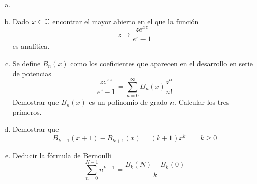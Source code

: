 \documentclass[twoside]{article}
\begin{document}
\newpage 
\begin{ejercicio}{7}
\begin{enumerate}[(a)]
\item[]
\item Dado $x\in \mathbb{C}$ encontrar el mayor abierto en el que la función
$$
z\mapsto \frac{ze^{xz}}{e^z-1}
$$
es analítica.
\item Se define $B_n(x)$ como los coeficientes que aparecen en el desarrollo en serie de potencias
$$
\frac{ze^{xz}}{e^z-1}= \sum_{n=0}^\infty B_n(x)\frac{z^n}{n!}
$$
Demostrar que $B_n(x)$ es un polinomio de grado $n$. Calcular los tres primeros.
\item Demostrar que 
$$
B_{k+1}(x+1)-B_{k+1}(x)=(k+1)x^k\qquad k\geq 0
$$
\item Deducir la fórmula de Bernoulli
$$
\sum_{n=0}^{N-1} n^{k-1} = \frac{B_k(N)-B_k(0)}{k}
$$
\end{enumerate}
\end{ejercicio}
\end{document}

